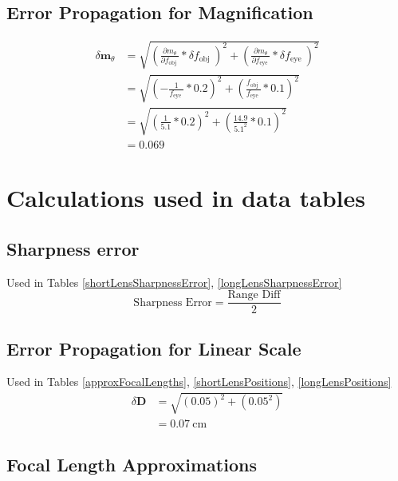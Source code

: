 \documentclass{report}
\begin{document}
\subsection{Error Propagation for Magnification}
$$
    \begin{aligned}
        \delta \mathbf{m}_{\theta} & =\sqrt{\left(\frac{\partial m_{\theta}}{\partial f_{\text {obj }}} * \delta f_{\text {obj }}\right)^{2}+\left(\frac{\partial m_{\theta}}{\partial f_{\text {eye }}} * \delta f_{\text {eye }}\right)^{2}} \\
                                   & =\sqrt{\left(-\frac{1}{f_{\text {eye }}} * 0.2\right)^{2}+\left(\frac{f_{\text {obj }}}{f_{\text {eye }}} * 0.1\right)^{2}}                                                                         \\
                                   & =\sqrt{\left(\frac{1}{5.1} * 0.2\right)^{2}+\left(\frac{14.9}{5.1^{2}} * 0.1\right)^{2}}                                                                                                                \\
                                   & =0.069 
    \end{aligned}
$$



\section{Calculations used in data tables}
\subsection{Sharpness error}
Used in Tables \ref{shortLensSharpnessError}, \ref{longLensSharpnessError}
$$
\text{Sharpness Error} = \frac{\text{Range Diff}}{2}
$$

\subsection{Error Propagation for Linear Scale}
Used in Tables \ref{approxFocalLengths}, \ref{shortLensPositions}, \ref{longLensPositions}
$$
    \begin{aligned}
        \delta \mathbf{D} & =\sqrt{(0.05)^{2}+\left(0.05^{2}\right)} \\
                          & =0.07 \mathrm{~cm}
    \end{aligned}
$$

\subsection{Focal Length Approximations}
\end{document}
